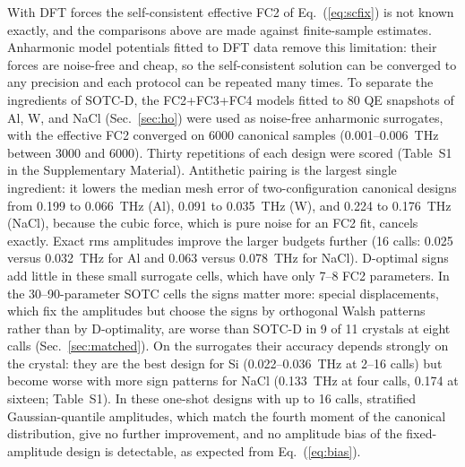 \documentclass[aip,jap,reprint,amsmath,amssymb,floatfix]{revtex4-2}
\begin{document}
With DFT forces the self-consistent effective FC2 of Eq.~(\ref{eq:scfix}) is
not known exactly, and the comparisons above are made against finite-sample
estimates. Anharmonic model potentials fitted to DFT data remove this
limitation: their forces are noise-free and cheap, so the self-consistent
solution can be converged to any precision and each protocol can be repeated
many times. To separate the ingredients of SOTC-D, the FC2+FC3+FC4 models fitted to 80
QE snapshots of Al, W, and NaCl (Sec.~\ref{sec:ho}) were used as noise-free
anharmonic surrogates, with the effective FC2 converged on 6000 canonical
samples (0.001--0.006~THz between 3000 and 6000). Thirty repetitions of each
design were scored (Table~S1 in the Supplementary Material). Antithetic
pairing is the largest single ingredient: it lowers the median mesh error of
two-configuration canonical designs from 0.199 to 0.066~THz (Al), 0.091 to
0.035~THz (W), and 0.224 to 0.176~THz (NaCl), because the cubic force, which
is pure noise for an FC2 fit, cancels exactly. Exact rms amplitudes
improve the larger budgets further (16 calls: 0.025 versus 0.032~THz for Al and
0.063 versus 0.078~THz for NaCl). D-optimal signs add little in these small
surrogate cells, which have only 7--8 FC2 parameters. In the
30--90-parameter SOTC cells the signs matter more: special displacements,
which fix the amplitudes but choose the signs by orthogonal Walsh patterns
rather than by D-optimality, are worse than SOTC-D in 9 of 11 crystals at
eight calls (Sec.~\ref{sec:matched}). On the surrogates their accuracy
depends strongly on the crystal: they are the best design for Si
(0.022--0.036~THz at 2--16 calls) but become worse with more sign patterns
for NaCl (0.133~THz at four calls, 0.174 at sixteen; Table~S1). In these one-shot designs with up to 16 calls,
stratified Gaussian-quantile amplitudes, which match the fourth moment of
the canonical distribution, give no further improvement, and no amplitude
bias of the fixed-amplitude design is detectable, as expected from
Eq.~(\ref{eq:bias}).
\end{document}
